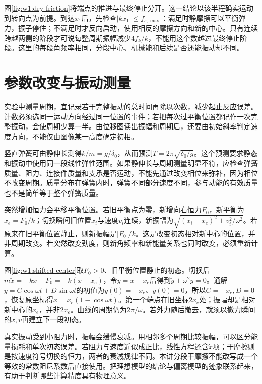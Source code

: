 图\ref{fig:w1:dry-friction}将端点的推进与最终停止分开。这一结论以该半程确实运动到转向点为前提。到达$x_1$后，先检查$|kx_1|\le f_{s,\max}$：满足时静摩擦可以平衡弹力，振子停住；不满足时才反向启动，使用相反的摩擦方向和新的中心。只有连续跨越两侧的阶段才可说每整周期振幅减少$4f_k/k$，不能用这个数越过最终停止阶段。这里的每段角频率相同，分段中心、机械能和后续是否还能振动却不同。

\section{参数改变与振动测量}
实验中测量周期，宜记录若干完整振动的总时间再除以次数，减少起止反应误差。计数必须选同一运动方向经过同一位置的事件；若把每次过平衡位置都记作一次完整振动，会使周期少算一半。由位移图读出振幅和周期后，还要由初始斜率判定速度方向，不能仅由图像某一高度确定初相。

竖直弹簧可由静伸长测得$k/m=g/\delta_0$，从而预测$T=2\pi\sqrt{\delta_0/g}$。这个预测要求静态和振动中使用同一段线性弹性范围。如果静伸长与周期测量明显不符，应检查弹簧质量、阻力、连接件质量和支承是否运动，不能先通过改变相位来弥补，因为相位不改变周期。质量分布在弹簧内时，弹簧不同部分速度不同，参与动能的有效质量也不是简单等于整个弹簧质量。

突然增加恒力会平移平衡位置。若旧平衡点为零，新增向右恒力$F_0$，新平衡为$x_e=F_0/k$；切换瞬间旧位置$x_i$与速度$v_i$连续，新振幅为$\sqrt{(x_i-x_e)^2+v_i^2/\omega^2}$。若原来在旧平衡位置静止，则新振幅是$|F_0|/k$。这是改变初态相对新中心的位置，并非周期改变。若突然改变劲度，则新角频率和新能量关系也同时改变，必须重新计算。

图\ref{fig:w1:shifted-center}取$F_0>0$、旧平衡位置静止的初态。切换后$m\ddot x=-kx+F_0=-k(x-x_e)$，令$y=x-x_e$后得到$\ddot y+\omega^2y=0$。通解$y=C\cos\omega t+D\sin\omega t$的初值为$y(0)=-x_e$、$\dot y(0)=0$，所以$C=-x_e,D=0$，恢复原坐标得$x=x_e(1-\cos\omega t)$。第一个端点在旧坐标$2x_e$处；振幅却是相对新中心的$x_e$，并非$2x_e$。曲线的周期仍为$2\pi/\omega$。若外力随后撤去，就须以撤力瞬间的$x,v$再建立下一段初态。


真实振动受到小阻力时，振幅会缓慢衰减。用相邻多个周期比较振幅，可以区分能量损耗和单次初态误差。若阻力与速度近似成正比，线性方程还含$\dot x$项；干摩擦则是按速度符号切换的恒力，两者的衰减规律不同。本讲分段干摩擦不能改写成一个等效的常数阻尼系数后直接使用。把理想模型的结论与偏离模型的迹象联系起来，有助于判断哪些计算精度具有物理意义。

